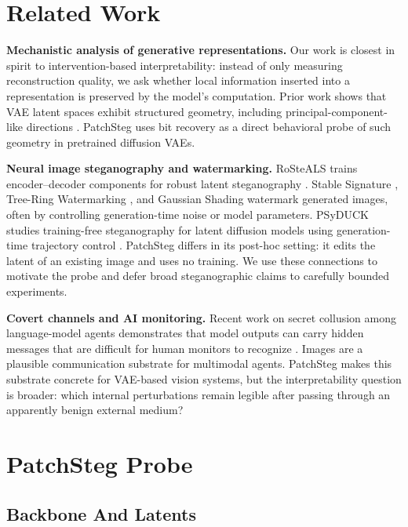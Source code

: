 \documentclass{article}
\begin{document}
\section{Related Work}

\textbf{Mechanistic analysis of generative representations.}
Our work is closest in spirit to intervention-based interpretability: instead of only measuring reconstruction quality, we ask whether local information inserted into a representation is preserved by the model's computation. Prior work shows that VAE latent spaces exhibit structured geometry, including principal-component-like directions \citep{rolinek2019variational}. PatchSteg uses bit recovery as a direct behavioral probe of such geometry in pretrained diffusion VAEs.

\textbf{Neural image steganography and watermarking.}
RoSteALS trains encoder--decoder components for robust latent steganography \citep{bui2023rosteals}. Stable Signature \citep{fernandez2023stable}, Tree-Ring Watermarking \citep{wen2023treering}, and Gaussian Shading \citep{yang2024gaussian} watermark generated images, often by controlling generation-time noise or model parameters. PSyDUCK studies training-free steganography for latent diffusion models using generation-time trajectory control \citep{jiang2025psyduck}. PatchSteg differs in its post-hoc setting: it edits the latent of an existing image and uses no training. We use these connections to motivate the probe and defer broad steganographic claims to carefully bounded experiments.

\textbf{Covert channels and AI monitoring.}
Recent work on secret collusion among language-model agents demonstrates that model outputs can carry hidden messages that are difficult for human monitors to recognize \citep{motwani2024secret}. Images are a plausible communication substrate for multimodal agents. PatchSteg makes this substrate concrete for VAE-based vision systems, but the interpretability question is broader: which internal perturbations remain legible after passing through an apparently benign external medium?

\section{PatchSteg Probe}
\label{sec:method}

\subsection{Backbone And Latents}
\end{document}
